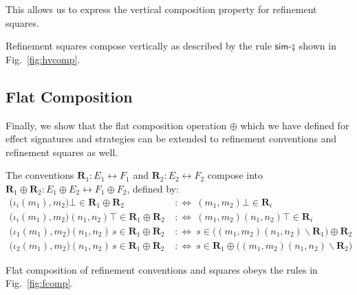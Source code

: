 \documentclass[acmsmall,screen,review,anonymous,nonacm]{acmart}
\newcommand{\kw}[1]{\ensuremath{ \mathsf{#1} }}
\begin{document}
This allows us to express the vertical composition property
for refinement squares.

\begin{theorem}
Refinement squares compose vertically
as described by the rule $\kw{sim}$-$\fatsemi$
shown in Fig.~\ref{fig:hvcomp}.
\end{theorem}


\subsection{Flat Composition} %

Finally,
we show that the flat composition operation $\oplus$
which we have defined for effect signatures and strategies
can be extended to refinement conventions and refinement squares as well.

\begin{definition}
The conventions
$\mathbf{R}_1 : E_1 \leftrightarrow F_1$ and
$\mathbf{R}_2 : E_2 \leftrightarrow F_2$
compose into
$\mathbf{R}_1 \oplus \mathbf{R}_2 : E_1 \oplus E_2 \leftrightarrow F_1 \oplus F_2$,
defined by:
\begin{align*}
  \bigl(\iota_i(m_1), m_2\bigr)\bot \in \mathbf{R}_1 \oplus \mathbf{R}_2
  \:&:\Leftrightarrow\:
  (m_1,m_2)\bot \in \mathbf{R}_i
\\
  \bigl(\iota_i(m_1), m_2\bigr)(n_1,n_2)\top \in \mathbf{R}_1 \oplus \mathbf{R}_2
  \:&:\Leftrightarrow\:
  (m_1,m_2)(n_1,n_2)\top \in \mathbf{R}_i
\\
  \bigl(\iota_1(m_1), m_2 \bigr)(n_1,n_2) \, s \in \mathbf{R}_1 \oplus \mathbf{R}_2
  \:&:\Leftrightarrow\:
  s \in \bigl( (m_1,m_2)(n_1,n_2) \backslash \mathbf{R}_1 \bigr) \oplus \mathbf{R}_2
\\
  \bigl(\iota_2(m_1), m_2 \bigr)(n_1,n_2) \, s \in \mathbf{R}_1 \oplus \mathbf{R}_2
  \:&:\Leftrightarrow\:
  s \in \mathbf{R}_1 \oplus \bigl( (m_1,m_2)(n_1,n_2) \backslash \mathbf{R}_2 \bigr)
\end{align*}
\end{definition}

\begin{theorem}%
Flat composition of refinement conventions and squares
obeys the rules in Fig.~\ref{fig:fcomp}.
\end{theorem}

\end{document}
